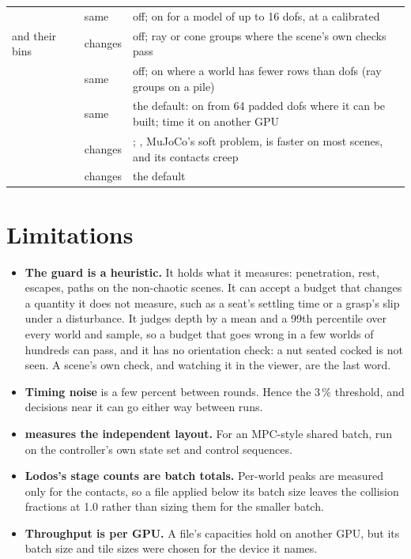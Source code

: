 \begin{longtable}{@{}L{30mm}L{17mm}L{14mm}L{84mm}@{}}
 &  & same & off; on for a model of up to 16 dofs, at a calibrated  \\
 and their bins &  & changes & off; ray or cone groups where the scene's own checks pass \\
 &  & same & off; on where a world has fewer rows than dofs (ray groups on a pile) \\
 &  & same & the default: on from 64 padded dofs where it can be built; time it on another GPU \\
 &  & changes & ; , MuJoCo's soft problem, is faster on most scenes, and its contacts creep \\
 &  & changes & the default \\
\bottomrule
\end{longtable}

\section{Limitations}\label{sec:limits}

\begin{itemize}
\item \textbf{The guard is a heuristic.} It holds what it measures: penetration, rest, escapes, paths on the non-chaotic scenes. It can accept a budget that changes a quantity it does not measure, such as a seat's settling time or a grasp's slip under a disturbance. It judges depth by a mean and a 99th percentile over every world and sample, so a budget that goes wrong in a few worlds of hundreds can pass, and it has no orientation check: a nut seated cocked is not seen. A scene's own check, and watching it in the viewer, are the last word.
\item \textbf{Timing noise} is a few percent between rounds. Hence the 3\,\% threshold, and decisions near it can go either way between runs.
\item \textbf{ measures the independent layout.} For an MPC-style shared batch, run  on the controller's own state set and control sequences.
\item \textbf{Lodos's stage counts are batch totals.} Per-world peaks are measured only for the contacts, so a file applied below its batch size leaves the collision fractions at 1.0 rather than sizing them for the smaller batch.
\item \textbf{Throughput is per GPU.} A file's capacities hold on another GPU, but its batch size and tile sizes were chosen for the device it names.
\end{itemize}


